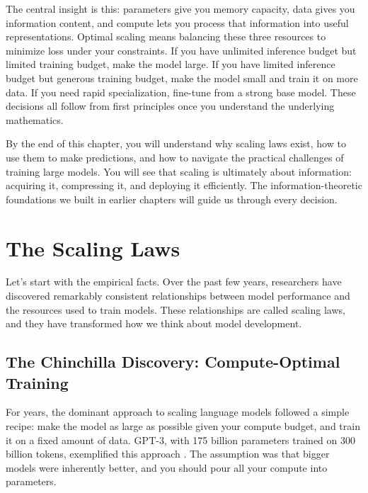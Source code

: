 The central insight is this: parameters give you memory capacity, data gives you information content, and compute lets you process that information into useful representations. Optimal scaling means balancing these three resources to minimize loss under your constraints. If you have unlimited inference budget but limited training budget, make the model large. If you have limited inference budget but generous training budget, make the model small and train it on more data. If you need rapid specialization, fine-tune from a strong base model. These decisions all follow from first principles once you understand the underlying mathematics.

By the end of this chapter, you will understand why scaling laws exist, how to use them to make predictions, and how to navigate the practical challenges of training large models. You will see that scaling is ultimately about information: acquiring it, compressing it, and deploying it efficiently. The information-theoretic foundations we built in earlier chapters will guide us through every decision.

\vspace{2em}

\section{The Scaling Laws}

Let's start with the empirical facts. Over the past few years, researchers have discovered remarkably consistent relationships between model performance and the resources used to train models. These relationships are called scaling laws, and they have transformed how we think about model development.

\vspace{1em}

\subsection{The Chinchilla Discovery: Compute-Optimal Training}

For years, the dominant approach to scaling language models followed a simple recipe: make the model as large as possible given your compute budget, and train it on a fixed amount of data. GPT-3, with 175 billion parameters trained on 300 billion tokens, exemplified this approach \citep{brown2020gpt3}. The assumption was that bigger models were inherently better, and you should pour all your compute into parameters.

